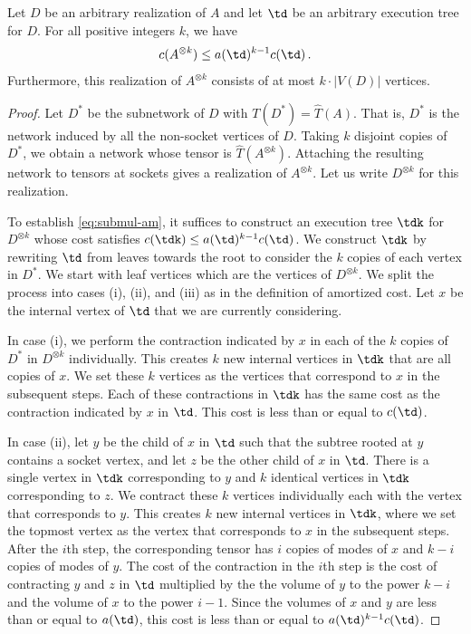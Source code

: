 \begin{theorem}
\label{thm:submul-am}
Let $D$ be an arbitrary realization of $A$ and let $\td$ be an arbitrary
execution tree for $D$. For all positive integers $k$, we have
\begin{equation}
\label{eq:submul-am}
c(A^{\otimes k})\leq a(\td)^{k-1} c(\td)\,.
\end{equation}
Furthermore, this realization of $A^{\otimes k}$ consists of
at most $k \cdot |V(D)|$ vertices.
\end{theorem}

\begin{proof}
Let $D^*$ be the subnetwork of $D$ with $T(D^*)=\hat{T}(A)$. That is,
$D^*$ is the network induced by all the non-socket vertices of $D$.
Taking $k$ disjoint copies of $D^*$, we obtain a network whose tensor is $\hat{T}(A^{\otimes k})$. Attaching the resulting network
to tensors at sockets gives a realization of $A^{\otimes k}$.
Let us write $D^{\otimes k}$ for this realization.

To establish \eqref{eq:submul-am}, it suffices to construct an execution
tree $\tdk$ for $D^{\otimes k}$ whose cost satisfies
$c(\tdk)\leq a(\td)^{k-1} c(\td)$. We construct $\tdk$
by rewriting $\td$ from leaves towards the root
to consider the $k$ copies of each vertex in $D^*$. We start with leaf vertices which are the vertices of $D^{\otimes k}$.
We split the process into cases (i), (ii), and (iii)
as in the definition of amortized cost.
Let $x$ be the internal vertex of $\td$ that we are currently considering.

In case (i), we perform the contraction indicated by $x$ in each of the
$k$ copies of $D^*$ in $D^{\otimes k}$ individually. This creates $k$ new internal vertices
in $\tdk$ that are all copies of $x$.  We set these $k$ vertices as the vertices
that correspond to $x$ in the subsequent steps. Each of these contractions in $\tdk$ has the
same cost as the contraction indicated by $x$ in $\td$. This cost is less than or equal to $c(\td)$.

In case (ii), let $y$ be the child of $x$ in $\td$ such that the subtree rooted at $y$ contains a socket vertex, and
let $z$ be the other child of $x$ in $\td$.
There is a single vertex in
$\tdk$ corresponding to $y$ and $k$ identical vertices
in $\tdk$
corresponding to $z$. We contract these $k$ vertices individually each with
the vertex that corresponds to $y$. This creates $k$ new internal vertices
in $\tdk$, where we set the topmost vertex as the vertex that corresponds
to $x$ in the subsequent steps. After the $i$th step, the corresponding tensor has $i$ copies of modes of $x$ and $k-i$ copies of modes of $y$. The cost of the  contraction in the $i$th step is the cost of contracting $y$ and $z$ in $\td$ multiplied by the the volume of $y$ to the power $k-i$ and the volume of $x$ to the power $i-1$. Since the volumes of $x$ and $y$ are less than or equal to $a(\td)$, this cost is less than or equal to $a(\td)^{k-1}c(\td)$.


\end{proof}
